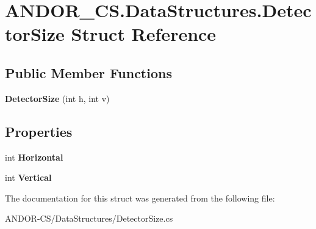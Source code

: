 \hypertarget{struct_a_n_d_o_r___c_s_1_1_data_structures_1_1_detector_size}{}\section{A\+N\+D\+O\+R\+\_\+\+C\+S.\+Data\+Structures.\+Detector\+Size Struct Reference}
\label{struct_a_n_d_o_r___c_s_1_1_data_structures_1_1_detector_size}
\subsection*{Public Member Functions}
\begin{DoxyCompactItemize}
\item 
\mbox{\label{struct_a_n_d_o_r___c_s_1_1_data_structures_1_1_detector_size_aa11f877355cc759136deba74e84962c0}} 
{\bfseries Detector\+Size} (int h, int v)
\end{DoxyCompactItemize}
\subsection*{Properties}
\begin{DoxyCompactItemize}
\item 
\mbox{\label{struct_a_n_d_o_r___c_s_1_1_data_structures_1_1_detector_size_ad1dd1d61914f0ee6e60796864db3a873}} 
int {\bfseries Horizontal}
\item 
\mbox{\label{struct_a_n_d_o_r___c_s_1_1_data_structures_1_1_detector_size_a3a0604f8ef49a8d80e0ec9c3599f36e8}} 
int {\bfseries Vertical}
\end{DoxyCompactItemize}


The documentation for this struct was generated from the following file\+:\begin{DoxyCompactItemize}
\item 
A\+N\+D\+O\+R-\/\+C\+S/\+Data\+Structures/Detector\+Size.\+cs\end{DoxyCompactItemize}

